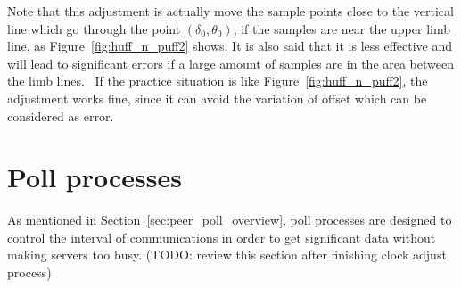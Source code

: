 

Note that this adjustment is actually move the sample points close to the
vertical line which go through the point $(\delta_0, \theta_0)$, if the samples
are near the upper limb line, as Figure~\ref{fig:huff_n_puff2} shows. It is
also said that it is less effective and will lead to significant errors if a
large amount of samples are in the area between the limb
lines.~\cite{huff_n_puff} If the practice situation is like
Figure~\ref{fig:huff_n_puff2}, the adjustment works fine, since it can
avoid the variation of offset which can be considered as error.


\section{Poll processes}%
\label{sec:poll_processes}
As mentioned in Section~\ref{sec:peer_poll_overview}, poll processes are
designed to control the interval of communications in order to get significant
data without making servers too busy. 
(TODO: review this section after finishing clock adjust process)



